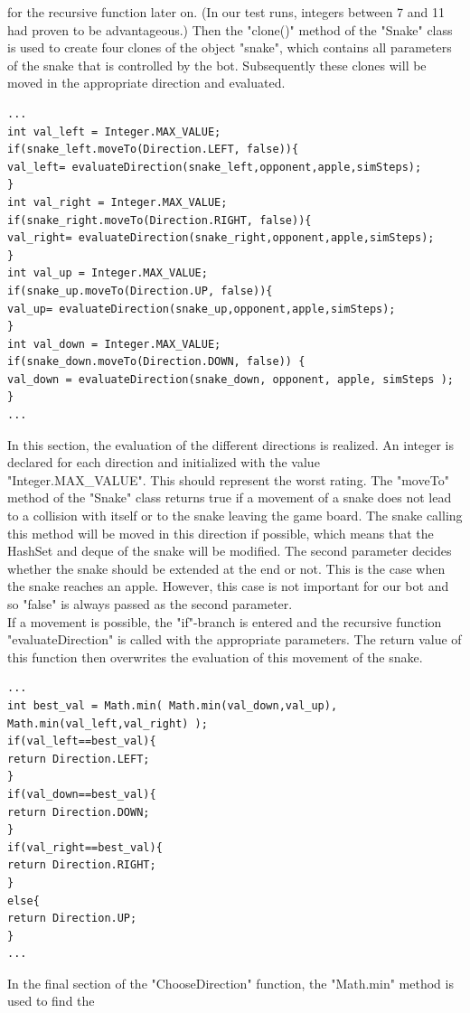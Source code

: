 \documentclass[a4paper,12pt]{article}
\begin{document}
for the recursive function later on. (In our test runs, integers between 7 and 11 had proven to be
advantageous.) Then the "clone()" method of the "Snake" class is used to create four clones of the
object "snake", which contains all parameters of the snake that is controlled by the bot.
Subsequently these clones will be moved in the appropriate direction and evaluated.
\begin{verbatim}
...
int val_left = Integer.MAX_VALUE;
if(snake_left.moveTo(Direction.LEFT, false)){
val_left= evaluateDirection(snake_left,opponent,apple,simSteps);
}
int val_right = Integer.MAX_VALUE;
if(snake_right.moveTo(Direction.RIGHT, false)){
val_right= evaluateDirection(snake_right,opponent,apple,simSteps);
}
int val_up = Integer.MAX_VALUE;
if(snake_up.moveTo(Direction.UP, false)){
val_up= evaluateDirection(snake_up,opponent,apple,simSteps);
}
int val_down = Integer.MAX_VALUE;
if(snake_down.moveTo(Direction.DOWN, false)) {
val_down = evaluateDirection(snake_down, opponent, apple, simSteps );
}
...
\end{verbatim}
In this section, the evaluation of the different directions is realized. An integer is declared for each direction and initialized with the value "Integer.MAX\_VALUE". This should represent the worst
rating. The "moveTo" method of the "Snake" class returns true if a movement of a snake does not
lead to a collision with itself or to the snake leaving the game board. The snake calling this method
will be moved in this direction if possible, which means that the HashSet and deque of the snake
will be modified. The second parameter decides whether the snake should be extended at the end or
not. This is the case when the snake reaches an apple. However, this case is not important for our
bot and so "false" is always passed as the second parameter.\\
If a movement is possible, the "if"-branch is entered and the recursive function "evaluateDirection"
is called with the appropriate parameters. The return value of this function then overwrites the
evaluation of this movement of the snake.
\begin{verbatim}
...
int best_val = Math.min( Math.min(val_down,val_up),
Math.min(val_left,val_right) );
if(val_left==best_val){
return Direction.LEFT;
}
if(val_down==best_val){
return Direction.DOWN;
}
if(val_right==best_val){
return Direction.RIGHT;
}
else{
return Direction.UP;
}
...
\end{verbatim}
In the final section of the "ChooseDirection" function, the "Math.min" method is used to find the
\end{document}
